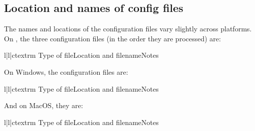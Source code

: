 \documentclass{howto}
\begin{document}
\subsection{Location and names of config files}
\label{sec:config-filenames}

The names and locations of the configuration files vary slightly across
platforms.  On \UNIX, the three configuration files (in the order they
are processed) are:
\begin{tableiii}{l|l|c}{textrm}
  {Type of file}{Location and filename}{Notes}
\end{tableiii}

On Windows, the configuration files are:
\begin{tableiii}{l|l|c}{textrm}
  {Type of file}{Location and filename}{Notes}
\end{tableiii}

And on MacOS, they are:
\begin{tableiii}{l|l|c}{textrm}
  {Type of file}{Location and filename}{Notes}
\end{tableiii}
\end{document}
